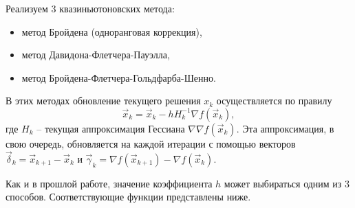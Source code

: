 \documentclass[11pt]{article}
\begin{document}
Реализуем 3 квазиньютоновских метода:
\begin{itemize}
    \item метод Бройдена (одноранговая
коррекция),
    \item метод Давидона-Флетчера-Пауэлла,
    \item метод Бройдена-Флетчера-Гольдфарба-Шенно.
\end{itemize}

В этих методах обновление текущего решения \(x_k\) осуществляется по
правилу \begin{equation*}
    \vec{x}_k = \vec{x}_k - h H_k^{-1} \nabla{f(\vec{x}_k)},
\end{equation*} где \(H_k\) -- текущая аппроксимация Гессиана
\(\nabla\nabla{f(\vec{x}_k)}\). Эта аппроксимация, в свою очередь,
обновляется на каждой итерации с помощью векторов
\(\vec{\delta}_k = \vec{x}_{k+1} - \vec{x}_k\) и
\(\vec{\gamma}_k = \nabla{f(\vec{x}_{k+1})} - \nabla{f(\vec{x}_k)}\).

Как и в прошлой работе, значение коэффициента \(h\) может выбираться
одним из 3 способов. Соответствующие функции представлены ниже.
    \newpage
\end{document}
